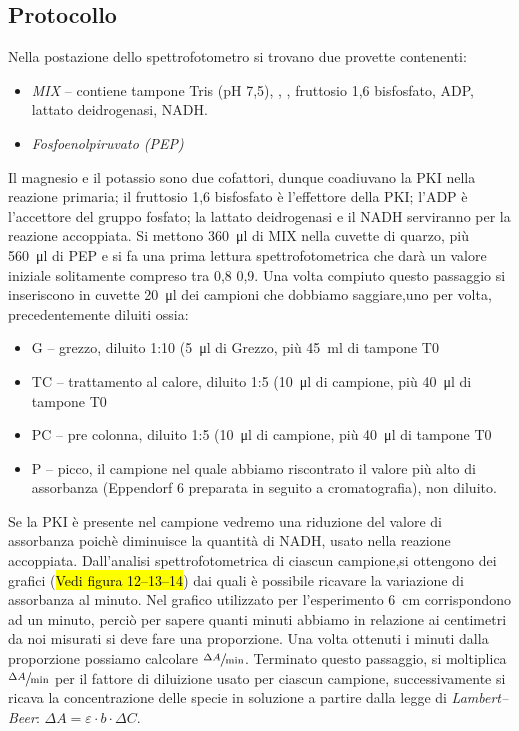 \documentclass[twocolumn,a4paper,10pt]{my_report}
\begin{document}
{\subsection*{Protocollo}
Nella postazione dello spettrofotometro si trovano due provette contenenti:
\begin{itemize}
 \item \emph{MIX} -- contiene tampone Tris (pH 7,5), , , fruttosio 1,6 bisfosfato, ADP, lattato deidrogenasi, NADH.
 \item \emph{Fosfoenolpiruvato (PEP)}
\end{itemize}

Il magnesio e il potassio sono due cofattori, dunque coadiuvano la PKI nella reazione primaria; il fruttosio 1,6 bisfosfato è l'effettore della PKI; l'ADP è l'accettore del gruppo fosfato; la lattato deidrogenasi e il NADH serviranno per la reazione accoppiata.
 Si mettono \SI{360}{\ul} di MIX nella cuvette di quarzo, più \SI{560}{\ul} di PEP e si fa una prima lettura spettrofotometrica che darà un valore iniziale solitamente compreso tra 0,8 0,9. Una volta compiuto questo passaggio si inseriscono in cuvette \SI{20}{\ul} dei campioni che dobbiamo saggiare,uno per volta, precedentemente diluiti ossia:
\begin{itemize}
 \item G -- grezzo, diluito 1:10 (\SI{5}{\ul} di Grezzo, più \SI{45}{\ml} di tampone T0
 \item TC -- trattamento al calore, diluito 1:5 (\SI{10}{\ul} di campione, più \SI{40}{\ul} di tampone T0
 \item PC -- pre colonna, diluito 1:5 (\SI{10}{\ul} di campione, più \SI{40}{\ul} di tampone T0
 \item P -- picco, il campione nel quale abbiamo riscontrato il valore più alto di assorbanza (Eppendorf 6 preparata in seguito a cromatografia), non diluito.
\end{itemize}

 Se la PKI è presente nel campione vedremo una riduzione del valore di assorbanza poichè diminuisce la quantità di NADH, usato nella reazione accoppiata.
Dall'analisi spettrofotometrica di ciascun campione,si ottengono dei grafici (\hl{Vedi figura 12--13--14}) dai quali è possibile ricavare la variazione di assorbanza al minuto. Nel grafico utilizzato per l'esperimento \SI{6}{\cm} corrispondono ad un minuto, perciò per sapere quanti minuti abbiamo in relazione ai centimetri da noi misurati si deve fare una proporzione. Una volta ottenuti i minuti dalla proporzione possiamo calcolare $\sfrac{\Delta A}{\text{min}}$.
Terminato questo passaggio, si moltiplica $\sfrac{\Delta A}{\text{min}}$ per il fattore di diluizione usato per ciascun campione, successivamente si ricava la concentrazione delle specie in soluzione a partire dalla legge di \emph{Lambert--Beer}\footnotemark: $\Delta A= \varepsilon \cdot b \cdot \Delta C$.

}
\end{document}

